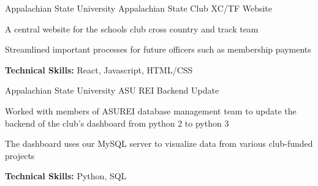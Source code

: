 

%

\begin{cventries}

  \cventry
    {Appalachian State University} %
    {Appalachian State Club XC/TF Website} %
    {} %
    {} %
    {
      \begin{cvitems} %
        \item {A central website for the schools club cross country and track team}
        \item {Streamlined important processes for future officers such as membership payments}
        \item {\textbf{Technical Skills:} React, Javascript, HTML/CSS}
      \end{cvitems}
    }

  \cventry
    {Appalachian State University} %
    {ASU REI Backend Update} %
    {} %
    {} %
    {
      \begin{cvitems} %
        \item {Worked with members of ASUREI database management team to update the backend of the club's dashboard from python 2 to python 3}
        \item {The dashboard uses our MySQL server to visualize data from various club-funded projects}
        \item {\textbf{Technical Skills:} Python, SQL}
      \end{cvitems}
    }



\end{cventries}
